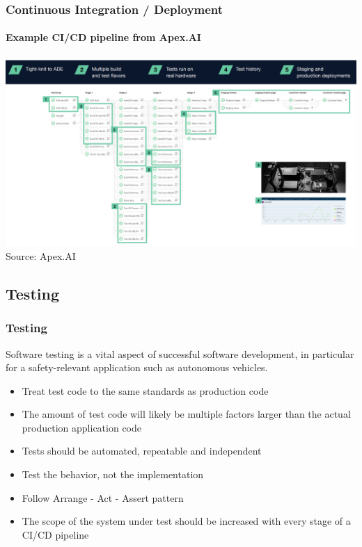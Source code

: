 \begin{frame}
\frametitle{Continuous Integration / Deployment}
\framesubtitle{Example CI/CD pipeline from Apex.AI}
\centering
\includegraphics[height=0.78\textheight]{images/apex_cicd.png}\\
\footnotesize{Source: Apex.AI}
\end{frame}

\subsection{Testing}

\begin{frame}
\frametitle{Testing}
Software testing is a vital aspect of successful software development, in
particular for a safety-relevant application such as autonomous vehicles.

\begin{itemize}
    \item Treat test code to the same standards as production code
    \item The amount of test code will likely be multiple factors larger 
        than the actual production application code
    \item Tests should be automated, repeatable and independent
    \item Test the behavior, not the implementation
    \item Follow Arrange - Act - Assert pattern
    \item The scope of the system under test should be increased with every
        stage of a CI/CD pipeline
\end{itemize}
\end{frame}

